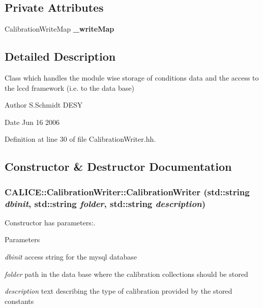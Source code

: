 \subsection*{Private Attributes}
\begin{DoxyCompactItemize}
\item 
CalibrationWriteMap {\bfseries \_\-writeMap}\label{classCALICE_1_1CalibrationWriter_a49641e6331fa8be1b3c2f561879fa647}

\end{DoxyCompactItemize}


\subsection{Detailed Description}
Class which handles the module wise storage of conditions data and the access to the lccd framework (i.e. to the data base) \begin{DoxyAuthor}{Author}
S.Schmidt DESY 
\end{DoxyAuthor}
\begin{DoxyDate}{Date}
Jun 16 2006 
\end{DoxyDate}


Definition at line 30 of file CalibrationWriter.hh.

\subsection{Constructor \& Destructor Documentation}
\subsubsection[{CalibrationWriter}]{\setlength{\rightskip}{0pt plus 5cm}CALICE::CalibrationWriter::CalibrationWriter (std::string {\em dbinit}, \/  std::string {\em folder}, \/  std::string {\em description})}\label{classCALICE_1_1CalibrationWriter_a4efaedff715a90c667dd9be3840c94fa}


Constructor has parameters:. 
\begin{DoxyParams}{Parameters}
\item[{\em dbinit}]access string for the mysql database \item[{\em folder}]path in the data base where the calibration collections should be stored \item[{\em description}]text describing the type of calibration provided by the stored constants \end{DoxyParams}


